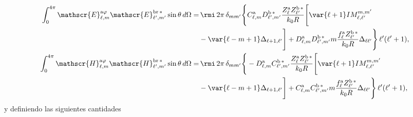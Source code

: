 \begin{align}
\int_0^{4\pi}\mathscr{E}_{\ell, m}^{\text{a}\varphi}\mathscr{E}_{\ell^{\prime}, m^{\prime}}^{\text{br}\,*}\sin\theta \, d\Omega
%
 =& \, \rmi \, 2\pi \, \delta_{m m^{\prime}} \Bigg\{ C_{\ell, m}^{\rm a} D_{\ell^{\prime}, m^{\prime}}^{\rm b \, *} \frac{Z_{\ell}^{\rm a} Z_{\ell^{\prime}}^{\rm b \, *}}{k_0 R} \Bigg[\var{\ell +1} IM_{\ell, \ell^{\prime}}^{m, m^{\prime}} \nonumber \\ 
% 
&-\var{\ell - m +1} \Delta_{\ell + 1, \ell^{\prime}}  \Bigg]
%
+ D_{\ell, m}^{\rm a} D_{\ell^{\prime}, m^{\prime}}^{\rm b \, *} m \frac{f_{\ell}^{\rm a} Z_{\ell^{\prime}}^{\rm b\, *}}{k_0 R} \Delta_{\ell \ell^{\prime}} \Bigg\} \, \ell^{\prime}(\ell^{\prime}+1),\\
%
%
\int_0^{4\pi}\mathscr{H}_{\ell, m}^{\text{a}\varphi}\mathscr{H}_{\ell^{\prime}, m^{\prime}}^{\text{br}\,*}\sin\theta \, d\Omega
%
 =& \, \rmi \, 2\pi \, \delta_{m m^{\prime}} \Bigg\{ -D_{\ell, m}^{\rm a} C_{\ell^{\prime}, m^{\prime}}^{\rm b \, *} \frac{Z_{\ell}^{\rm a} Z_{\ell^{\prime}}^{\rm b \, *}}{k_0 R} \Bigg[\var{\ell +1} IM_{\ell, \ell^{\prime}}^{m, m^{\prime}} \nonumber \\ 
% 
&-\var{\ell - m +1} \Delta_{\ell + 1, \ell^{\prime}}  \Bigg]
%
+ C_{\ell, m}^{\rm a} C_{\ell^{\prime}, m^{\prime}}^{\rm b \, *} m \frac{f_{\ell}^{\rm a} Z_{\ell^{\prime}}^{\rm b\, *}}{k_0 R} \Delta_{\ell \ell^{\prime}} \Bigg\} \, \ell^{\prime}(\ell^{\prime}+1),
\end{align}
y definiendo las siguientes cantidades
